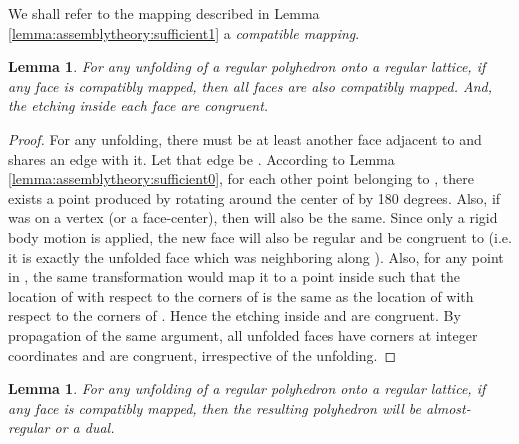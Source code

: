 \documentclass[11pt]{article}
\newtheorem{lemma}[thm]{Lemma}
\newcommand{\1}{\mathds{1}}
\begin{document}
We shall refer to the mapping described in Lemma \ref{lemma:assemblytheory:sufficient1} a \emph{compatible mapping}.


\begin{lemma}
\label{lemma:assemblytheory:sufficient2}
 For any unfolding of a regular polyhedron onto a regular lattice, if any face  is compatibly mapped, then all faces are also compatibly mapped. And, the etching inside each face are congruent.
\end{lemma}

\begin{proof}
 For any unfolding, there must be at least another face adjacent to  and shares an edge with it. Let that edge be . According to Lemma \ref{lemma:assemblytheory:sufficient0}, for each other point  belonging to , there exists a point  produced by rotating  around the center of  by 180 degrees. Also, if  was on a vertex (or a face-center), then  will also be the same. Since only a rigid body motion is applied, the new face  will also be regular and be congruent to  (i.e. it is exactly the unfolded face which was neighboring  along ). Also, for any point  in , the same transformation would map it to a point  inside  such that the location of  with respect to the corners of  is the same as the location of  with respect to the corners of . Hence the etching inside  and  are congruent. By propagation of the same argument, all unfolded faces have corners at integer coordinates and are congruent, irrespective of the unfolding.
\end{proof}


\begin{lemma}
\label{lemma:assemblytheory:sufficient3}
 For any unfolding of a regular polyhedron onto a regular lattice, if any face  is compatibly mapped, then the resulting polyhedron will be \emph{almost-regular} or a dual.
\end{lemma}
\end{document}
